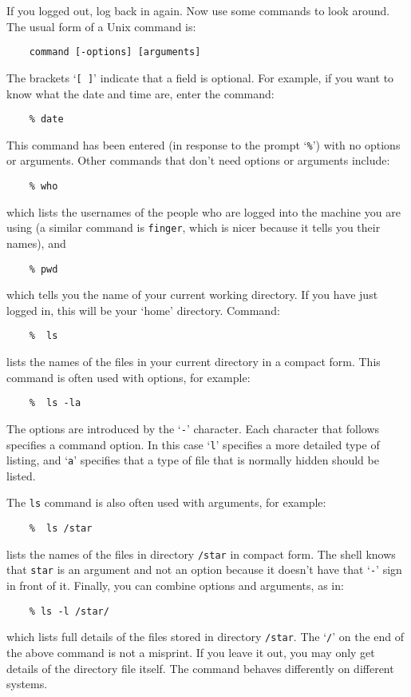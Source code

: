 If you logged out, log back in again.
Now use some commands to look around.
The usual form of a Unix command is:
\begin{verbatim}
    command [-options] [arguments]
\end{verbatim}
The brackets `{\tt [ ]}' indicate that a field is optional.
For example, if you want to know what the date and time are, enter the command:
\begin{verbatim}
    % date
\end{verbatim}
This command has been entered (in response to the prompt `{\tt \%}') with no
options or arguments.
Other commands that don't need options or arguments include:
\begin{verbatim}
    % who
\end{verbatim}
which lists the usernames of the people who are logged into the machine you are
using (a similar command is {\tt finger}, which is nicer because it tells you
their names), and
\begin{verbatim}
    % pwd
\end{verbatim}
which tells you the name of your current working directory.
If you have just logged in, this will be your `home' directory.
Command:
\begin{verbatim}
    %  ls
\end{verbatim}
lists the names of the files in your current directory in a compact form.
This command is often used with options, for example:
\begin{verbatim}
    %  ls -la
\end{verbatim}
The options are introduced by the `{\tt -}' character.
Each character that follows specifies a command option.
In this case `{\tt l}' specifies a more detailed type of listing, and `{\tt a}'
specifies that a type of file that is normally hidden should be listed.

The {\tt ls} command is also often used with arguments, for example:
\begin{verbatim}
    %  ls /star
\end{verbatim}
lists the names of the files in directory {\tt /star} in compact form.
The shell knows that {\tt star} is an argument and not an option because it
doesn't have that `{\tt -}' sign in front of it.
Finally, you can combine options and arguments, as in:
\begin{verbatim}
    % ls -l /star/
\end{verbatim}
which lists full details of the files stored in directory {\tt /star}.
The `{\tt /}' on the end of the above command is not a misprint.
If you leave it out, you may only get details of the directory file
itself.
The command behaves differently on different systems.

